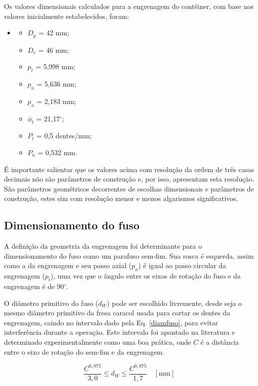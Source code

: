 Os valores dimensionais calculados para a engrenagem do contêiner, com base nos valores inicialmente estabelecidos, foram:

\begin{itemize}\label{calculo_fuso}
    \item []
    \begin{itemize}
        \item $D_p$ = 42 mm;
        \item $D_e$ = 46 mm;
        \item $p_t$ = 5,998 mm;
        \item $p_n$ = 5,636 mm;
        \item $p_x$ = 2,183 mm;
        \item $\phi_t$ = 21,17$^{\circ}$;
        \item $P_t$ = 0,5 dentes/mm;
        \item $P_n$ = 0,532 mm.
    \end{itemize}
\end{itemize}

É importante salientar que os valores acima com resolução da ordem de três casas decimais não são parâmetros de construção e, por isso, apresentam esta resolução. São parâmetros geométricos decorrentes de escolhas dimensionais e parâmetros de construção, estes sim com resolução menor e menos algarismos significativos.

\subsection{Dimensionamento do fuso} 

A definição da geometria da engrenagem foi determinante para o dimensionamento do fuso como um parafuso sem-fim. Sua rosca é esquerda, assim como a da engrenagem e seu passo axial ($p_x$) é igual ao passo circular da engrenagem ($p_t$), uma vez que o ângulo entre os eixos de rotação do fuso e da engrenagem é de 90$^{\circ}$. 

O diâmetro primitivo do fuso ($d_W$) pode ser escolhido livremente, desde seja o mesmo diâmetro primitivo da fresa caracol usada para cortar os dentes da engrenagem, caindo no intervalo dado pela Eq. \ref{diamfuso}, para evitar interferência durante a operação. Este intervalo foi apontado na literatura e determinado experimentalmente como uma boa prática, onde $C$ é a distância entre o eixo de rotação do sem-fim e da engrenagem. \cite{shigley2005}

\begin{equation}
\label{diamfuso}
  \frac{C^{0,875}}{3,0} \le d_W \le \frac{C^{0,875}}{1,7} \quad [\text{mm}]
\end{equation}

